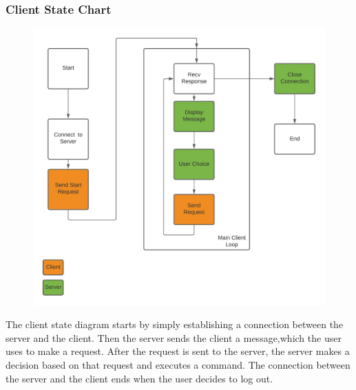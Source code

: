 \documentclass[11pt]{article}
\begin{document}
			\subsubsection{Client State Chart}
				\begin{figure}[H]
					\centering
					\includegraphics[scale=0.7]{Client_State_Diagram}
					\label{fig:clientstatediagram}
				\end{figure}
				The client state diagram starts by simply establishing a connection between the server and the client. Then the server sends the client a message,which the user uses to make a request. After the request is sent to the server, the server makes a decision based on that request and executes a command. The connection between the server and the client ends when the user decides to log out.
\end{document}
